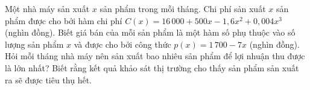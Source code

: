 \begin{ex}%
	Một nhà máy sản xuất $x$ sản phẩm trong mỗi tháng. Chi phí sản xuất $x$ sản phẩm được cho bởi hàm chi phí $C(x)=16\,000+500x-1{,}6x^2+0{,}004x^3$ (nghìn đồng). Biết giá bán của mỗi sản phẩm là một hàm số phụ thuộc vào số lượng sản phẩm $x$ và được cho bởi công thức $p(x)=1\,700-7x$ (nghìn đồng). Hỏi mỗi tháng nhà máy nên sản xuất bao nhiêu sản phẩm để lợi nhuận thu được là lớn nhất? Biết rằng kết quả khảo sát thị trường cho thấy sản phẩm sản xuất ra sẽ được tiêu thụ hết.
\end{ex}

